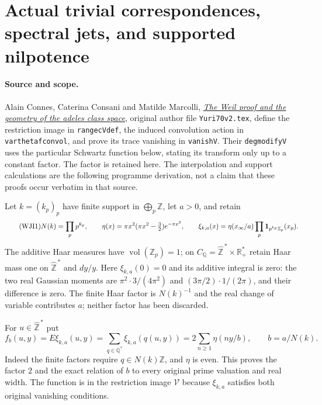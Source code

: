 \section{Actual trivial correspondences, spectral jets, and supported nilpotence}
\label{sec:cc-weil-jet-interpolation}

\paragraph{Source and scope.}
Alain Connes, Caterina Consani and Matilde Marcolli,
\href{https://arxiv.org/abs/math/0703392v1}{\emph{The Weil proof and the
geometry of the adeles class space}}, original author file
\texttt{Yuri70v2.tex}, define the restriction image in
\texttt{rangecVdef}, the induced convolution action in
\texttt{varthetafconvol}, and prove its trace vanishing in
\texttt{vanishV}. Their \texttt{degmodifyV} uses the particular
Schwartz function below, stating its transform only up to a
constant factor. The factor is retained here. The interpolation
and support calculations are the following programme derivation,
not a claim that these proofs occur verbatim in that source.

Let $k=(k_p)_p$ have finite support in $\bigoplus_p\mathbb Z$,
let $a>0$, and retain
\begin{equation}\tag{WJI1}
 N(k)=\prod_p p^{k_p},\qquad
 \eta(x)=\pi x^2(\pi x^2-\tfrac32)e^{-\pi x^2},\qquad
 \xi_{k,a}(x)=\eta(x_\infty/a)
                     \prod_p{\bf1}_{p^{k_p}\mathbb Z_p}(x_p).
\end{equation}
The additive Haar measures have
$\operatorname{vol}(\mathbb Z_p)=1$; on
$C_{\mathbb Q}=\widehat{\mathbb Z}^{\,*}\times\mathbb R_+^*$
retain Haar mass one on $\widehat{\mathbb Z}^{\,*}$ and $dy/y$.
Here $\xi_{k,a}(0)=0$ and its additive integral is zero:
the two real Gaussian moments are
$\pi^2\cdot3/(4\pi^2)$ and $(3\pi/2)\cdot1/(2\pi)$,
and their difference is zero. The finite Haar factor is
$N(k)^{-1}$ and the real change of variable contributes $a$;
neither factor has been discarded.

For $u\in\widehat{\mathbb Z}^{\,*}$ put
\begin{equation}\tag{WJI2}
 f_b(u,y)=E\xi_{k,a}(u,y)
   =\sum_{q\in\mathbb Q^*}\xi_{k,a}(q(u,y))
   =2\sum_{n\ge1}\eta(ny/b),\qquad b=a/N(k).
\end{equation}
Indeed the finite factors require $q\in N(k)\mathbb Z$,
and $\eta$ is even. This proves the factor $2$ and the exact
relation of $b$ to every original prime valuation and real width.
The function is in the restriction image $\mathcal V$ because
$\xi_{k,a}$ satisfies both original vanishing conditions.

